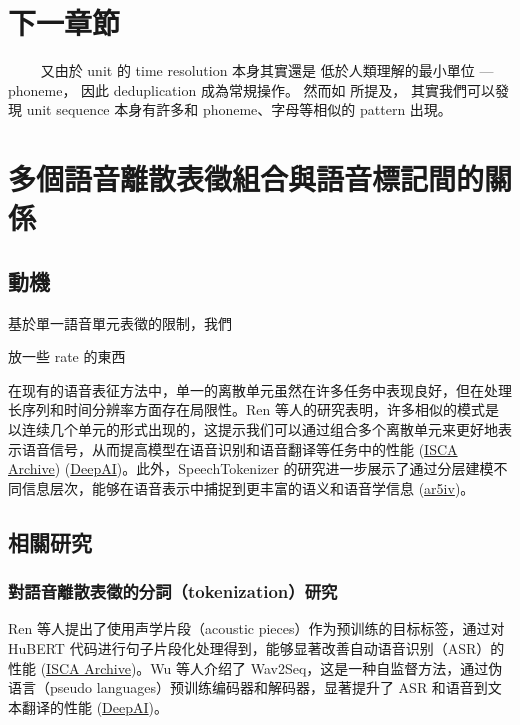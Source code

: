 

\chapter{下一章節}
　　
又由於 unit 的 time resolution 本身其實還是
低於人類理解的最小單位 --- phoneme，
因此 deduplication 成為常規操作。
然而如
 所提及，
其實我們可以發現
unit sequence 本身有許多和 phoneme、字母等相似的 pattern 出現。



\chapter{多個語音離散表徵組合與語音標記間的關係}

\section{動機}

基於單一語音單元表徵的限制，我們

放一些 rate 的東西


在现有的语音表征方法中，单一的离散单元虽然在许多任务中表现良好，但在处理长序列和时间分辨率方面存在局限性。Ren 等人的研究表明，许多相似的模式是以连续几个单元的形式出现的，这提示我们可以通过组合多个离散单元来更好地表示语音信号，从而提高模型在语音识别和语音翻译等任务中的性能 (\href{https://www.isca-archive.org/interspeech_2022/ren22_interspeech.html}{ISCA Archive}) (\href{https://deepai.org/publication/speech-pre-training-with-acoustic-piece}{DeepAI})。此外，SpeechTokenizer 的研究进一步展示了通过分层建模不同信息层次，能够在语音表示中捕捉到更丰富的语义和语音学信息 (\href{https://ar5iv.org/pdf/2308.16692}{ar5iv})。 


\section{相關研究}

\subsection{對語音離散表徵的分詞（tokenization）研究}

Ren 等人提出了使用声学片段（acoustic pieces）作为预训练的目标标签，通过对 HuBERT 代码进行句子片段化处理得到，能够显著改善自动语音识别（ASR）的性能 (\href{https://www.isca-archive.org/interspeech_2022/ren22_interspeech.html}{ISCA Archive})。Wu 等人介绍了 Wav2Seq，这是一种自监督方法，通过伪语言（pseudo languages）预训练编码器和解码器，显著提升了 ASR 和语音到文本翻译的性能 (\href{https://deepai.org/publication/speech-pre-training-with-acoustic-piece}{DeepAI})。


